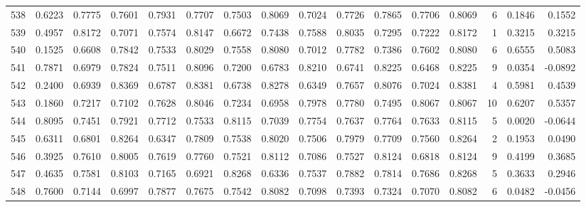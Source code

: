\begin{tabular}{lrrrrrrrrrrrrrrr}
538 &      0.6223 &  0.7775 &  0.7601 &  0.7931 &  0.7707 &  0.7503 &  0.8069 &  0.7024 &  0.7726 &  0.7865 &   0.7706 &     0.8069 &      6 &                    0.1846 &                     0.1552 \\
539 &      0.4957 &  0.8172 &  0.7071 &  0.7574 &  0.8147 &  0.6672 &  0.7438 &  0.7588 &  0.8035 &  0.7295 &   0.7222 &     0.8172 &      1 &                    0.3215 &                     0.3215 \\
540 &      0.1525 &  0.6608 &  0.7842 &  0.7533 &  0.8029 &  0.7558 &  0.8080 &  0.7012 &  0.7782 &  0.7386 &   0.7602 &     0.8080 &      6 &                    0.6555 &                     0.5083 \\
541 &      0.7871 &  0.6979 &  0.7824 &  0.7511 &  0.8096 &  0.7200 &  0.6783 &  0.8210 &  0.6741 &  0.8225 &   0.6468 &     0.8225 &      9 &                    0.0354 &                    -0.0892 \\
542 &      0.2400 &  0.6939 &  0.8369 &  0.6787 &  0.8381 &  0.6738 &  0.8278 &  0.6349 &  0.7657 &  0.8076 &   0.7024 &     0.8381 &      4 &                    0.5981 &                     0.4539 \\
543 &      0.1860 &  0.7217 &  0.7102 &  0.7628 &  0.8046 &  0.7234 &  0.6958 &  0.7978 &  0.7780 &  0.7495 &   0.8067 &     0.8067 &     10 &                    0.6207 &                     0.5357 \\
544 &      0.8095 &  0.7451 &  0.7921 &  0.7712 &  0.7533 &  0.8115 &  0.7039 &  0.7754 &  0.7637 &  0.7764 &   0.7633 &     0.8115 &      5 &                    0.0020 &                    -0.0644 \\
545 &      0.6311 &  0.6801 &  0.8264 &  0.6347 &  0.7809 &  0.7538 &  0.8020 &  0.7506 &  0.7979 &  0.7709 &   0.7560 &     0.8264 &      2 &                    0.1953 &                     0.0490 \\
546 &      0.3925 &  0.7610 &  0.8005 &  0.7619 &  0.7760 &  0.7521 &  0.8112 &  0.7086 &  0.7527 &  0.8124 &   0.6818 &     0.8124 &      9 &                    0.4199 &                     0.3685 \\
547 &      0.4635 &  0.7581 &  0.8103 &  0.7165 &  0.6921 &  0.8268 &  0.6336 &  0.7537 &  0.7882 &  0.7814 &   0.7686 &     0.8268 &      5 &                    0.3633 &                     0.2946 \\
548 &      0.7600 &  0.7144 &  0.6997 &  0.7877 &  0.7675 &  0.7542 &  0.8082 &  0.7098 &  0.7393 &  0.7324 &   0.7070 &     0.8082 &      6 &                    0.0482 &                    -0.0456 \\

\end{tabular}
